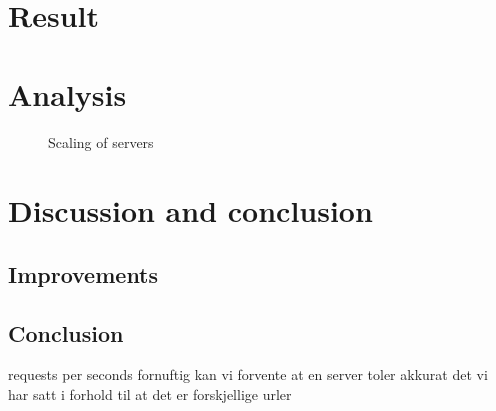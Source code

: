 \section{Result}

\section{Analysis}
\begin{figure}[htp]
\centering
{}
\caption{\label{fig:server_scaling}Scaling of servers}
\end{figure}

\section{Discussion and conclusion}
\subsection{Improvements}

\subsection{Conclusion}



requests per seconds fornuftig kan vi forvente at en server toler akkurat
det vi har satt i forhold til at det er forskjellige urler

